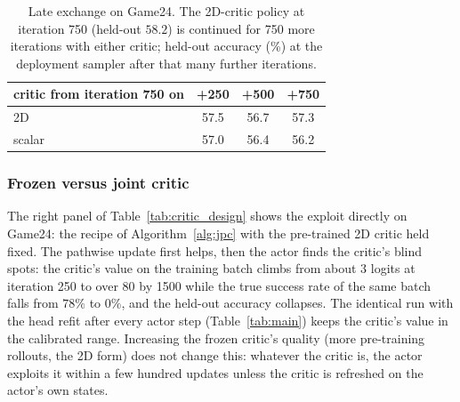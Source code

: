 \begin{table}[H]\centering\small
\caption{Late exchange on Game24. The 2D-critic policy at iteration 750 (held-out $58.2$) is continued for 750 more iterations with either critic; held-out accuracy (\%) at the deployment sampler after that many further iterations.}\label{tab:swap_late}
\begin{tabular}{@{}lccc@{}}\toprule
critic from iteration 750 on & +250 & +500 & +750\\\midrule
2D & 57.5 & 56.7 & 57.3\\
scalar & 57.0 & 56.4 & 56.2\\
\bottomrule\end{tabular}\end{table}

\fi


\subsubsection{Frozen versus joint critic}
\label{app:frozen}
The right panel of Table~\ref{tab:critic_design} shows the exploit directly on Game24: the recipe of Algorithm~\ref{alg:jpc} with the pre-trained 2D critic held fixed. The pathwise update first helps, then the actor finds the critic's blind spots: the critic's value on the training batch climbs from about $3$ logits at iteration 250 to over $80$ by 1500 while the true success rate of the same batch falls from $78\%$ to $0\%$, and the held-out accuracy collapses. The identical run with the head refit after every actor step (Table~\ref{tab:main}) keeps the critic's value in the calibrated range. Increasing the frozen critic's quality (more pre-training rollouts, the 2D form) does not change this: whatever the critic is, the actor exploits it within a few hundred updates unless the critic is refreshed on the actor's own states.

\iffalse

